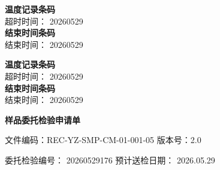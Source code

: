 \documentclass[UTF8,10pt,a4paper,fontset=fandol]{ctexart}
\newcommand{\fieldvalue}[1]{#1}
\begin{document}
\medskip
\noindent
\begin{minipage}[t]{0.47\linewidth}
\scriptsize
\textbf{温度记录条码}\\
超时时间：%
\fieldvalue{2026\text{-}05\text{-}29\ }\\
\textbf{结束时间条码}\\
结束时间：%
\fieldvalue{2026\text{-}05\text{-}29\ }
\end{minipage}
\hfill
\begin{minipage}[t]{0.47\linewidth}
\scriptsize
\textbf{温度记录条码}\\
超时时间：%
\fieldvalue{2026\text{-}05\text{-}29\ }\\
\textbf{结束时间条码}\\
结束时间：%
\fieldvalue{2026\text{-}05\text{-}29\ }
\end{minipage}


\newpage

\begin{center}
{\Large \textbf{样品委托检验申请单}}
\end{center}

\noindent
文件编码：REC-YZ-SMP-CM-01-001-05 \hfill 版本号：2.0

\vspace{0.5em}

\noindent
委托检验编号：
\fieldvalue{20260529176}
\hfill
预计送检日期：
\fieldvalue{2026.05.29}

\vspace{0.5em}
\end{document}
